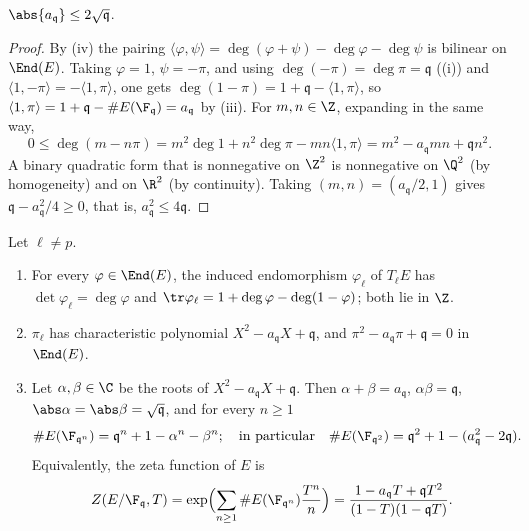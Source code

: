 \begin{theorem}[Hasse]\label{thm:ellcurves:hasse}
$\abs{a_{\mathfrak q}}\le2\sqrt{\mathfrak q}$.
\end{theorem}

\begin{proof}
By (iv) the pairing $\langle\varphi,\psi\rangle=\deg(\varphi+\psi)-\deg\varphi-\deg\psi$ is bilinear on $\End(E)$. Taking $\varphi=1$, $\psi=-\pi$, and using
$\deg(-\pi)=\deg\pi=\mathfrak q$ ((i)) and $\langle1,-\pi\rangle=-\langle1,\pi\rangle$, one gets $\deg(1-\pi)=1+\mathfrak q-\langle1,\pi\rangle$, so
$\langle1,\pi\rangle=1+\mathfrak q-\#E(\F_{\mathfrak q})=a_{\mathfrak q}$ by (iii). For $m,n\in\Z$, expanding in the same way,
\[
0\le\deg(m-n\pi)=m^2\deg1+n^2\deg\pi-mn\langle1,\pi\rangle=m^2-a_{\mathfrak q}mn+\mathfrak qn^2 .
\]
A binary quadratic form that is nonnegative on $\Z^2$ is nonnegative on $\Q^2$ (by homogeneity) and on $\R^2$ (by continuity). Taking $(m,n)=(a_{\mathfrak q}/2,1)$ gives
$\mathfrak q-a_{\mathfrak q}^2/4\ge0$, that is, $a_{\mathfrak q}^2\le4\mathfrak q$.
\end{proof}

\begin{theorem}\label{thm:ellcurves:charpoly}
Let $\ell\ne p$.
\begin{enumerate}[label=(\roman*)]
\item For every $\varphi\in\End(E)$, the induced endomorphism $\varphi_\ell$ of $T_\ell E$ has $\det\varphi_\ell=\deg\varphi$ and $\tr\varphi_\ell=1+\deg\varphi-\deg(1-\varphi)$; both lie in $\Z$.
\item $\pi_\ell$ has characteristic polynomial $X^2-a_{\mathfrak q}X+\mathfrak q$, and $\pi^2-a_{\mathfrak q}\pi+\mathfrak q=0$ in $\End(E)$.
\item Let $\alpha,\beta\in\C$ be the roots of $X^2-a_{\mathfrak q}X+\mathfrak q$. Then $\alpha+\beta=a_{\mathfrak q}$, $\alpha\beta=\mathfrak q$, $\abs\alpha=\abs\beta=\sqrt{\mathfrak q}$, and for every $n\ge1$
\[
\#E(\F_{\mathfrak q^n})=\mathfrak q^n+1-\alpha^n-\beta^n;\quad\text{in particular}\quad\#E(\F_{\mathfrak q^2})=\mathfrak q^2+1-(a_{\mathfrak q}^2-2\mathfrak q).
\]
Equivalently, the zeta function of $E$ is
\[
Z(E/\F_{\mathfrak q},T)=\exp\Bigl(\sum_{n\ge1}\#E(\F_{\mathfrak q^n})\frac{T^n}n\Bigr)=\frac{1-a_{\mathfrak q}T+\mathfrak qT^2}{(1-T)(1-\mathfrak qT)} .
\]
\end{enumerate}
\end{theorem}

